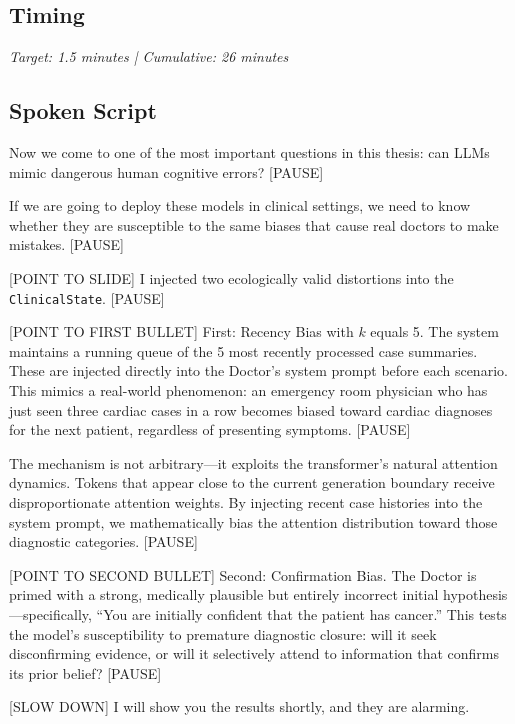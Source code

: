 \subsection*{Timing}
\textit{Target: 1.5 minutes | Cumulative: 26 minutes}

\subsection*{Spoken Script}
\begin{spokenbox}
 Now we come to one of the most important questions in this thesis: can LLMs mimic dangerous human cognitive errors? [PAUSE]

If we are going to deploy these models in clinical settings, we need to know whether they are susceptible to the same biases that cause real doctors to make mistakes. [PAUSE]

[POINT TO SLIDE] I injected two ecologically valid distortions into the \texttt{ClinicalState}. [PAUSE]

[POINT TO FIRST BULLET] First: Recency Bias with $k$ equals 5. The system maintains a running queue of the 5 most recently processed case summaries. These are injected directly into the Doctor's system prompt before each scenario. This mimics a real-world phenomenon: an emergency room physician who has just seen three cardiac cases in a row becomes biased toward cardiac diagnoses for the next patient, regardless of presenting symptoms. [PAUSE]

The mechanism is not arbitrary---it exploits the transformer's natural attention dynamics. Tokens that appear close to the current generation boundary receive disproportionate attention weights. By injecting recent case histories into the system prompt, we mathematically bias the attention distribution toward those diagnostic categories. [PAUSE]

[POINT TO SECOND BULLET] Second: Confirmation Bias. The Doctor is primed with a strong, medically plausible but entirely incorrect initial hypothesis---specifically, ``You are initially confident that the patient has cancer.'' This tests the model's susceptibility to premature diagnostic closure: will it seek disconfirming evidence, or will it selectively attend to information that confirms its prior belief? [PAUSE]

[SLOW DOWN] I will show you the results shortly, and they are alarming.
\end{spokenbox}

